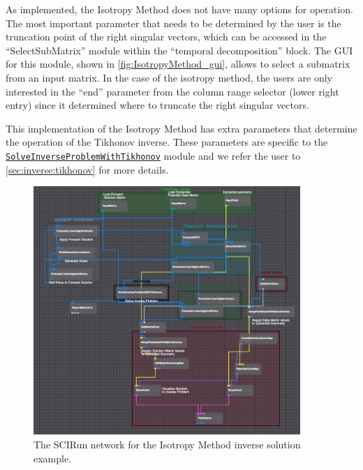     As implemented, the Isotropy Method does not have many options for operation. The most important parameter that needs to be determined by the user is the truncation point of the right singular vectors, which can be accessed in the ``SelectSubMatrix'' module within the ``temporal decomposition'' block. 
    The GUI for this module, shown in \autoref{fig:IsotropyMethod_gui}, allows to select a submatrix from an input matrix. In the case of the isotropy method, the users are only interested in the ``end'' parameter from the column range selector (lower right entry) since it determined where to truncate the right singular vectors.
    
    This implementation of the Isotropy Method has extra parameters that determine the operation of the Tikhonov inverse. These parameters are specific to the \href{http://scirundocwiki.sci.utah.edu/SCIRunDocs/index.php/CIBC:Documentation:SCIRun:Reference:BioPSE:SolveInverseProblemWithTikhonov}{{\tt SolveInverseProblemWithTikhonov}} module and we refer the user to \autoref{sec:inverse:tikhonov} for more details.
    
    \begin{figure}
        \begin{center}
        \includegraphics[width=0.9\textwidth]{ECGToolkitGuide_figures/IsotropyMethod_networkExample.png}
        \caption{The SCIRun network for the Isotropy Method inverse solution example.}
        \label{fig:IsotropyMethod}
        \end{center}
    \end{figure}
    
